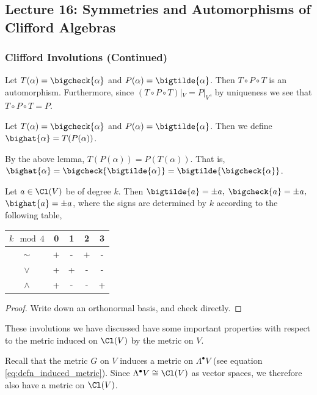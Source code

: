 \subsection{Lecture 16: Symmetries and Automorphisms of Clifford Algebras}
\subsubsection{Clifford Involutions (Continued)}
\begin{lemma}
Let $T(\alpha) = \bigcheck{\alpha}$ and $P(\alpha) = \bigtilde{\alpha}$. Then $T\circ P \circ T$ is an automorphism. Furthermore, since $(T\circ P \circ T)|_V = P|_V$, by uniqueness we see that $T\circ P \circ T = P$.  
\end{lemma}
\begin{defn}
    Let $T(\alpha) = \bigcheck{\alpha}$ and $P(\alpha) = \bigtilde{\alpha}$. Then we define $\bighat{\alpha} = T(P(\alpha))$. 
\end{defn}
\begin{remark*}
    By the above lemma, $T(P(\alpha))=P(T(\alpha))$. That is, $\bighat{\alpha}=\bigcheck{\bigtilde{\alpha}}=\bigtilde{\bigcheck{\alpha}}$.
\end{remark*}
\begin{thm}
    Let $a \in \Cl(V)$ be of degree $k$. Then $\bigtilde{a}=\pm a,$ $ \bigcheck{a}=\pm a,$ $\bighat{a}=\pm a$, where the signs are determined by $k$ according to the following table,
    \begin{center}
    \begin{tabular}{c|cccc}
         $k\mod 4$ & 0 &1&2&3  \\\hline
         $\sim$& +&-&+&-\\
         $\vee$&+&+&-&-\\
         $\wedge$&+&-&-&+
    \end{tabular}
    \end{center}
    \label{thm:kmod4}
\end{thm}
\begin{proof}
    Write down an orthonormal basis, and check directly.
\end{proof}
These involutions we have discussed have some important properties with respect to the metric induced on $\Cl(V)$ by the metric on $V$.
\begin{remark*}
Recall that the metric $G$ on $V$ induces a metric on $\Lambda^\bullet V$ (see equation \ref{eq:defn_induced_metric}). Since $\Lambda^\bullet V \cong \Cl(V)$ as vector spaces, we therefore also have a metric on $\Cl(V)$.
\end{remark*}
